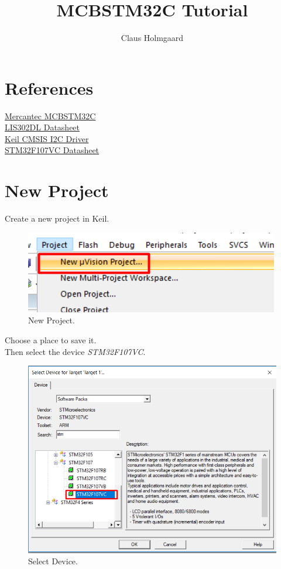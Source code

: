 \documentclass{article}
\title{MCBSTM32C Tutorial}
\author{Claus Holmgaard}
\date{}
\begin{document}
\maketitle

\newpage
{}

\section{References}
\href{http://mars.merhot.dk/w/index.php/MCBSTM32C}{Mercantec MCBSTM32C}\\
\href{http://www.st.com/content/ccc/resource/technical/document/datasheet/63/67/d2/6d/88/e0/4e/39/CD00135460.pdf/files/CD00135460.pdf/jcr:content/translations/en.CD00135460.pdf}{LIS302DL Datasheet}\\
\href{http://www.keil.com/pack/doc/CMSIS/Driver/html/group__i2c__interface__gr.html}{Keil CMSIS I2C Driver}\\
\href{http://www.keil.com/dd/docs/datashts/st/stm32f105(7)xx_ds.pdf}{STM32F107VC Datasheet}

\section{New Project}

Create a new project in Keil.
\begin{figure}[H]
    \centering
    \includegraphics[width=0.8\linewidth]{pics/NewProject.png}
    \caption{New Project.}
    \label{fig:NewProject}
\end{figure}

Choose a place to save it.\\
Then select the device \textit{STM32F107VC}.
\begin{figure}[H]
    \centering
    \includegraphics[width=0.8\linewidth]{pics/SelectDevice.png}
    \caption{Select Device.}
    \label{fig:SelectDevice}
\end{figure}
\end{document}

